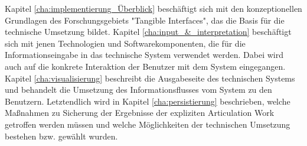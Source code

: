 Kapitel \ref{cha:implementierung_Überblick} beschäftigt sich mit den konzeptionellen Grundlagen des Forschungsgebiets "Tangible Interfaces", das die Basis für die technische Umsetzung bildet. Kapitel \ref{cha:input_&_interpretation} beschäftigt sich mit jenen Technologien und Softwarekomponenten, die für die Informationseingabe in das technische System verwendet werden. Dabei wird auch auf die konkrete Interaktion der Benutzer mit dem System eingegangen. Kapitel \ref{cha:visualisierung} beschreibt die Ausgabeseite des technischen Systems und behandelt die Umsetzung des Informationsflusses vom System zu den Benutzern. Letztendlich wird in Kapitel \ref{cha:persistierung} beschrieben, welche Maßnahmen zu Sicherung der Ergebnisse der expliziten Articulation Work getroffen werden müssen und welche Möglichkeiten der technischen Umsetzung bestehen bzw. gewählt wurden.


%








